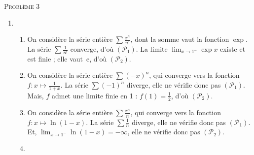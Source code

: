 \documentclass[a4paper]{article}
\begin{document}
	\begin{center}
		\LARGE \textsc{Problème 3}
	\end{center}
	\begin{enumerate}
		\item
			\begin{enumerate}
				\item On considère la série entière $\sum \frac{x^n}{n!}$, dont la somme vaut la fonction $\exp$.
					La série $\sum \frac{1}{n!}$\/ converge, d'où $(\mathcal{P}_1)$.
					La limite $\lim_{x\to 1^-} \exp x$\/ existe et est finie ; elle vaut~$\mathrm{e}$, d'où $(\mathcal{P}_2)$.
				\item On considère la série entière $\sum (-x)^n$, qui converge vers la fonction $f: x \mapsto \frac{1}{1+x}$. La série $\sum (-1)^n$\/ diverge, elle ne vérifie donc pas $(\mathcal{P}_1)$. Mais, $f$\/ admet une limite finie en 1 : $f(1) = \frac{1}{2}$, d'où $(\mathcal{P}_2)$.
				\item On considère la série entière $\sum \frac{x^n}{n}$, qui converge vers la fonction $f:x\mapsto \ln(1-x)$. La série $\sum \frac{1}{n}$\/ diverge, elle ne vérifie donc pas $(\mathcal{P}_1)$.
					Et, $\lim_{x\to 1^-} \ln(1-x) = -\infty$, elle ne vérifie donc pas $(\mathcal{P}_2)$.
				\item 
			\end{enumerate}
	\end{enumerate}
\end{document}
